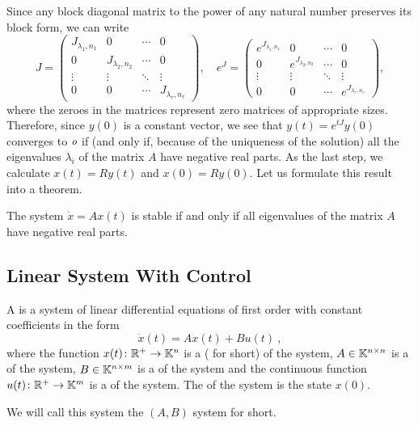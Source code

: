Since any block diagonal matrix to the power of any natural number preserves its block form, we can write
\begin{equation*}
	J=
	\begin{pmatrix}
		J_{\lambda_1,n_1} & 0 & \cdots & 0 \\
		0 & J_{\lambda_2,n_2} & \cdots & 0 \\
		\vdots & \vdots & \ddots & \vdots \\
		0 & 0 & \cdots & J_{\lambda_r,n_r}
	\end{pmatrix},
	\quad 
	e^J=
	\begin{pmatrix}
		e^{J_{\lambda_1,n_1}} & 0 & \cdots & 0 \\
		0 & e^{J_{\lambda_2,n_2}} & \cdots & 0 \\
		\vdots & \vdots & \ddots & \vdots \\
		0 & 0 & \cdots & e^{J_{\lambda_r,n_r}}
	\end{pmatrix}
	,
\end{equation*}
where the zeroes in the matrices represent zero matrices of appropriate sizes. Therefore, since $y(0)$ is a constant vector, we see that $y(t)=e^{tJ}y(0)$ converges to $\textit{o}$ if (and only if, because of the uniqueness of the solution) all the eigenvalues $\lambda_i$ of the matrix $A$ have negative real parts. As the last step, we calculate $x(t)=Ry(t)$ and $x(0)=Ry(0)$. Let us formulate this result into a theorem.

\begin{theorem}
\label{theorem:stability}
	The system $\dot{x}=Ax(t)$ is stable if and only if all eigenvalues of the matrix $A$ have negative real parts.
\end{theorem}

\subsection{Linear System With Control}

\begin{definition}
	A  is a system of linear differential equations of first order with constant coefficients in the form $$\dot{x}(t)=Ax(t)+Bu(t)\ ,$$ where the function $x(t)\colon\mathbb{R}^+\to\mathbb{K}^n$ is a  ( for short) of the system, $A\in\mathbb{K}^{n\times n}$ is a  of the system, $B\in\mathbb{K}^{n\times m}$ is a  of the system and the continuous function $u(t)\colon\mathbb{R}^+\to\mathbb{K}^m$ is a  of the system. The  of the system is the state $x(0)$.

	We will call this system the $(A,B)$ system for short.
\end{definition}

